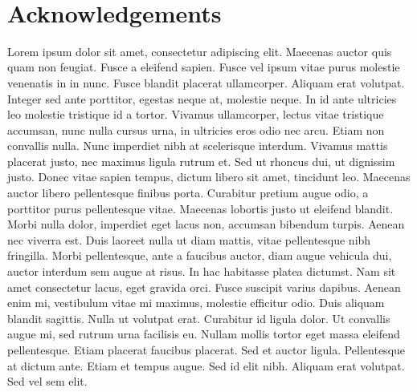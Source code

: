\documentclass[
  12pt,
  b5paperpaper,
  twoside]{scrreprt}
\begin{document}
\begin{spacing}{1.5}


\clearpage
 \begin{flushleft}%
  \thispagestyle{empty}
  \normalsize\itshape{}
\end{flushleft}
\clearpage


\clearpage
~
\thispagestyle{empty}
\clearpage


\clearpage
\chapter*{\sffamily Acknowledgements}
\vspace*{\baselineskip}
\normalsize{Lorem ipsum dolor sit amet, consectetur adipiscing elit.
Maecenas auctor quis quam non feugiat. Fusce a eleifend sapien. Fusce
vel ipsum vitae purus molestie venenatis in in nunc. Fusce blandit
placerat ullamcorper. Aliquam erat volutpat. Integer sed ante porttitor,
egestas neque at, molestie neque. In id ante ultricies leo molestie
tristique id a tortor. Vivamus ullamcorper, lectus vitae tristique
accumsan, nunc nulla cursus urna, in ultricies eros odio nec arcu. Etiam
non convallis nulla. Nunc imperdiet nibh at scelerisque interdum.
Vivamus mattis placerat justo, nec maximus ligula rutrum et. Sed ut
rhoncus dui, ut dignissim justo. Donec vitae sapien tempus, dictum
libero sit amet, tincidunt leo. Maecenas auctor libero pellentesque
finibus porta. Curabitur pretium augue odio, a porttitor purus
pellentesque vitae. Maecenas lobortis justo ut eleifend blandit. Morbi
nulla dolor, imperdiet eget lacus non, accumsan bibendum turpis. Aenean
nec viverra est. Duis laoreet nulla ut diam mattis, vitae pellentesque
nibh fringilla. Morbi pellentesque, ante a faucibus auctor, diam augue
vehicula dui, auctor interdum sem augue at risus. In hac habitasse
platea dictumst. Nam sit amet consectetur lacus, eget gravida orci.
Fusce suscipit varius dapibus. Aenean enim mi, vestibulum vitae mi
maximus, molestie efficitur odio. Duis aliquam blandit sagittis. Nulla
ut volutpat erat. Curabitur id ligula dolor. Ut convallis augue mi, sed
rutrum urna facilisis eu. Nullam mollis tortor eget massa eleifend
pellentesque. Etiam placerat faucibus placerat. Sed et auctor ligula.
Pellentesque at dictum ante. Etiam et tempus augue. Sed id elit nibh.
Aliquam erat volutpat. Sed vel sem elit.}
\clearpage


\end{spacing}
\end{document}
